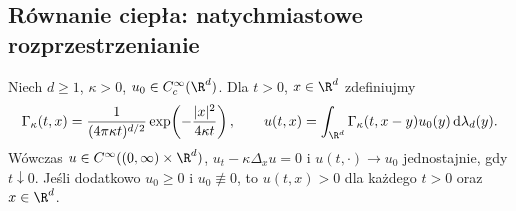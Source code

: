 \subsection{Równanie ciepła: natychmiastowe rozprzestrzenianie}

\begin{stwierdzenie}
\label{prop:heat-kernel}
Niech $d\geq1$, $\kappa>0$, $u_0\in C_c^\infty(\R^d)$.
Dla $t>0$, $x\in\R^d$ zdefiniujmy
\begin{equation}\label{eq:heat-kernel}
 \Gamma_\kappa(t,x)=\frac{1}{(4\pi\kappa t)^{d/2}}
 \exp\!\left(-\frac{|x|^2}{4\kappa t}\right),\qquad
 u(t,x)=\int_{\R^d}\Gamma_\kappa(t,x-y)u_0(y)\,
 \mathrm d\lambda_d(y).
\end{equation}
Wówczas $u\in C^\infty((0,\infty)\times\R^d)$,
$u_t-\kappa\Delta_xu=0$ i
$u(t,\cdot)\to u_0$ jednostajnie, gdy $t\downarrow0$.
Jeśli dodatkowo $u_0\geq0$ i $u_0\not\equiv0$, to
$u(t,x)>0$ dla każdego $t>0$ oraz $x\in\R^d$.
\end{stwierdzenie}
